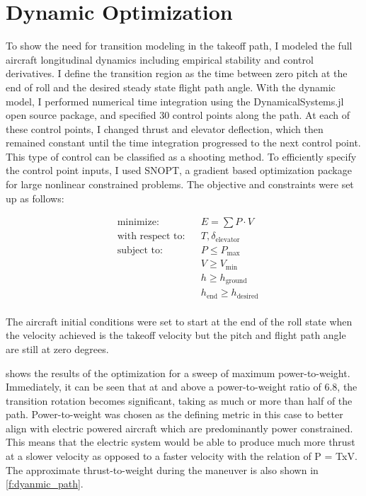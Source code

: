 \documentclass[10pt,english]{article}
\begin{document}
\section{Dynamic Optimization}
To show the need for transition modeling in the takeoff path, I modeled the full aircraft longitudinal dynamics\cite{beard} including empirical stability and control derivatives\cite{aerosonde}.  I define the transition region as the time between zero pitch at the end of roll and the desired steady state flight path angle.  With the dynamic model, I performed numerical time integration using the DynamicalSystems.jl open source package, and specified 30 control points along the path.  At each of these control points, I changed thrust and elevator deflection, which then remained constant until the time integration progressed to the next control point.  This type of control can be classified as a shooting method.  To efficiently specify the control point inputs, I used SNOPT\cite{snopt}, a gradient based optimization package for large nonlinear constrained problems.  The objective and constraints were set up as follows:

\[
\begin{aligned}
& \text{minimize:} & & E = \sum{P \cdot V} \\
& \text{with respect to:} & & T, \delta_\text{elevator}\\
& \text{subject to:}
& &  \displaystyle P \leq P_{\text{max}}  \\
& & & \displaystyle V \geq V_{\text{min}}  \\
& & & \displaystyle h \geq h_{\text{ground}}  \\
& & & \displaystyle h_\text{end} \geq h_{\text{desired}}  \\
\end{aligned}
\]


\vspace{10pt}
\noindent The aircraft initial conditions were set to start at the end of the roll state when the velocity achieved is the takeoff velocity but the pitch and flight path angle are still at zero degrees.

 shows the results of the optimization for a sweep of maximum power-to-weight.  Immediately, it can be seen that at and above a power-to-weight ratio of 6.8, the transition rotation becomes significant, taking as much or more than half of the path.  Power-to-weight was chosen as the defining metric in this case to better align with electric powered aircraft which are predominantly power constrained.  This means that the electric system would be able to produce much more thrust at a slower velocity as opposed to a faster velocity with the relation of P = TxV.  The approximate thrust-to-weight during the maneuver is also shown in \cref{f:dyanmic_path}.
\end{document}
